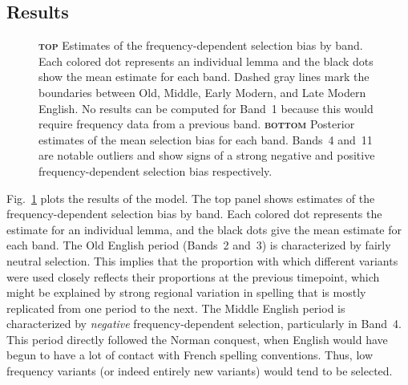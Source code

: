 \documentclass[doc,biblatex]{apa7}
\begin{document}
\subsection{Results}

	\begin{figure}
	\vspace*{2pt}
	\caption{\textbf{\textsc{top}} Estimates of the frequency-dependent selection bias by band. Each colored dot represents an individual lemma and the black dots show the mean estimate for each band. Dashed gray lines mark the boundaries between Old, Middle, Early Modern, and Late Modern English. No results can be computed for Band~1 because this would require frequency data from a previous band. \textbf{\textsc{bottom}} Posterior estimates of the mean selection bias for each band. Bands~4 and~11 are notable outliers and show signs of a strong negative and positive frequency-dependent selection bias respectively.}
	\label{fds_posterior}
	\end{figure}

Fig.~\ref{fds_posterior} plots the results of the model. The top panel shows estimates of the frequency-dependent selection bias by band. Each colored dot represents the estimate for an individual lemma, and the black dots give the mean estimate for each band. The Old English period (Bands~2 and~3) is characterized by fairly neutral selection. This implies that the proportion with which different variants were used closely reflects their proportions at the previous timepoint, which might be explained by strong regional variation in spelling that is mostly replicated from one period to the next. The Middle English period is characterized by \textit{negative} frequency-dependent selection, particularly in Band~4. This period directly followed the Norman conquest, when English would have begun to have a lot of contact with French spelling conventions. Thus, low frequency variants (or indeed entirely new variants) would tend to be selected.
\end{document}

